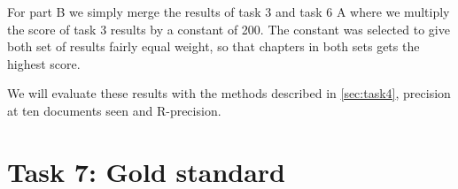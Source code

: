 For part B we simply merge the results of task 3 and task 6 A where we
multiply the score of task 3 results by a constant of 200. The constant was
selected to give both set of results fairly equal weight, so that chapters
in both sets gets the highest score.

We will evaluate these results with the methods described in
\autoref{sec:task4}, precision at ten documents seen and R-precision.


\section{Task 7: Gold standard}


